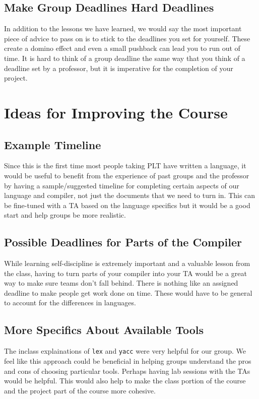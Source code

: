 \subsection{Make Group Deadlines Hard Deadlines}
In addition to the lessons we have learned, we would say the most important
piece of advice to pass on is to stick to the deadlines you set for yourself.
These create a domino effect and even a small pushback can lead you to run out
of time. It is hard to think of a group deadline the same way that you think of
a deadline set by a professor, but it is imperative for the completion of your
project.

\section{Ideas for Improving the Course}
\subsection{Example Timeline}
Since this is the first time most people taking PLT have written a language, it
would be useful to benefit from the experience of past groups and the professor
by having a sample/suggested timeline for completing certain aspects of our
language and compiler, not just the documents that we need to turn in. This can
be fine-tuned with a TA based on the language specifics but it would be a good
start and help groups be more realistic.

\subsection{Possible Deadlines for Parts of the Compiler}
While learning self-discipline is extremely important and a valuable lesson from
the class, having to turn parts of your compiler into your TA would be a great
way to make sure teams don't fall behind. There is nothing like an assigned
deadline to make people get work done on time. These would have to be general to
account for the differences in languages.

\subsection{More Specifics About Available Tools}
The inclass explainations of \verb$lex$ and \verb$yacc$ were very helpful for
our group. We feel like this approach could be beneficial in helping groups
understand the pros and cons of choosing particular tools. Perhaps having lab
sessions with the TAs would be helpful. This would also help to make the class
portion of the course and the project part of the course more cohesive.
